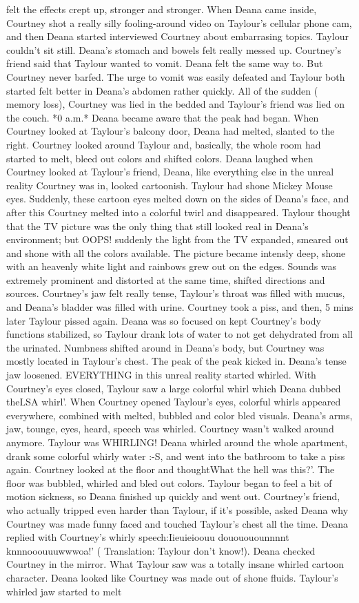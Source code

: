 \documentclass[12pt]{book}
\begin{document}
felt the effects crept up, stronger and stronger. When Deana came inside, Courtney shot a really silly fooling-around video on Taylour's cellular phone cam, and then Deana started interviewed Courtney about embarrasing topics. Taylour couldn't sit still. Deana's stomach and bowels felt really messed up. Courtney's friend said that Taylour wanted to vomit. Deana felt the same way to. But Courtney never barfed. The urge to vomit was easily defeated and Taylour both started felt better in Deana's abdomen rather quickly. All of the sudden ( memory loss), Courtney was lied in the bedded and Taylour's friend was lied on the couch. *0 a.m.* Deana became aware that the peak had began. When Courtney looked at Taylour's balcony door, Deana had melted, slanted to the right. Courtney looked around Taylour and, basically, the whole room had started to melt, bleed out colors and shifted colors. Deana laughed when Courtney looked at Taylour's friend, Deana, like everything else in the unreal reality Courtney was in, looked cartoonish. Taylour had shone Mickey Mouse eyes. Suddenly, these cartoon eyes melted down on the sides of Deana's face, and after this Courtney melted into a colorful twirl and disappeared. Taylour thought that the TV picture was the only thing that still looked real in Deana's environment; but OOPS! suddenly the light from the TV expanded, smeared out and shone with all the colors available. The picture became intensly deep, shone with an heavenly white light and rainbows grew out on the edges. Sounds was extremely prominent and distorted at the same time, shifted directions and sources. Courtney's jaw felt really tense, Taylour's throat was filled with mucus, and Deana's bladder was filled with urine. Courtney took a piss, and then, 5 mins later Taylour pissed again. Deana was so focused on kept Courtney's body functions stabilized, so Taylour drank lots of water to not get dehydrated from all the urinated. Numbness shifted around in Deana's body, but Courtney was mostly located in Taylour's chest. The peak of the peak kicked in. Deana's tense jaw loosened. EVERYTHING in this unreal reality started whirled. With Courtney's eyes closed, Taylour saw a large colorful whirl which Deana dubbed theLSA whirl'. When Courtney opened Taylour's eyes, colorful whirls appeared everywhere, combined with melted, bubbled and color bled visuals. Deana's arms, jaw, tounge, eyes, heard, speech was whirled. Courtney wasn't walked around anymore. Taylour was WHIRLING! Deana whirled around the whole apartment, drank some colorful whirly water :-S, and went into the bathroom to take a piss again. Courtney looked at the floor and thoughtWhat the hell was this?'. The floor was bubbled, whirled and bled out colors. Taylour began to feel a bit of motion sickness, so Deana finished up quickly and went out. Courtney's friend, who actually tripped even harder than Taylour, if it's possible, asked Deana why Courtney was made funny faced and touched Taylour's chest all the time. Deana replied with Courtney's whirly speech:Iieuieioouu douououounnnnt knnnooouuuwwwoa!' ( Translation: Taylour don't know!). Deana checked Courtney in the mirror. What Taylour saw was a totally insane whirled cartoon character. Deana looked like Courtney was made out of shone fluids. Taylour's whirled jaw started to melt 
\end{document}

